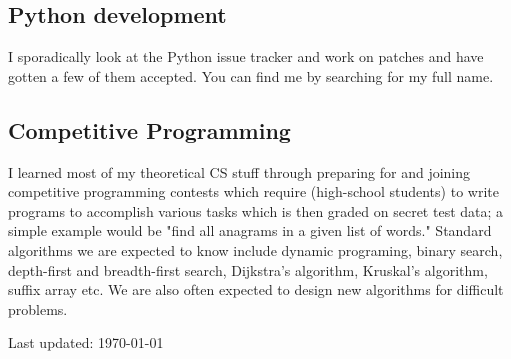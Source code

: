 \documentclass[letterpaper]{article}
\def\footerlink{}
\begin{document}
  \subsection*{Python development}

  I sporadically look at the Python issue tracker and work on patches and have gotten a few of them accepted. You can find me by searching for my full name.

  \subsection*{Competitive Programming}

  I learned most of my theoretical CS stuff through preparing for and joining competitive programming contests which require (high-school students) to write programs to accomplish various tasks which is then graded on secret test data; a simple example would be "find all anagrams in a given list of words." Standard algorithms we are expected to know include dynamic programing, binary search, depth-first and breadth-first search, Dijkstra's algorithm, Kruskal's algorithm, suffix array etc. We are also often expected to design new algorithms for difficult problems.

  \bigskip


\begin{center}
  \begin{footnotesize}
    Last updated: \today \\
    \href{\footerlink}{\texttt{\footerlink}}
  \end{footnotesize}
\end{center}
\end{document}
